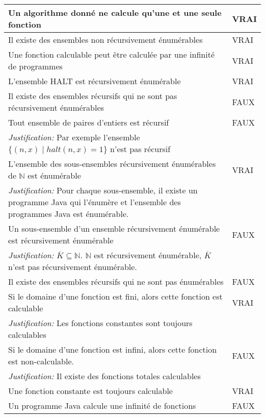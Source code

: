 \begin{tabular}{p{13cm}|l}
    \hline
    Un algorithme donné ne calcule qu'une et une seule fonction & VRAI \\
    \hline
    Il existe des ensembles non récursivement énumérables & VRAI \\
    \hline
    Une fonction calculable peut être calculée par une infinité de programmes & VRAI \\
    \hline
    L'ensemble HALT est récursivement énumérable & VRAI \\
    \hline
    Il existe des ensembles récursifs qui ne sont pas récursivement énumérables & FAUX \\
    \hline
    Tout ensemble de paires d'entiers est récursif & FAUX \\
    \textit{Justification:} Par exemple l'ensemble $\{(n,x) \mid \mathit{halt}(n,x)=1\}$ n'est pas récursif & \\
    \hline
    L'ensemble des sous-ensembles récursivement énumérables de $\mathbb{N}$ est énumérable & VRAI \\
    \textit{Justification:} Pour chaque sous-ensemble, il existe un programme Java qui l'énumère et l'ensemble des programmes Java est énumérable. & \\
    \hline
    Un sous-ensemble d'un ensemble récursivement énumérable est récursivement énumérable & FAUX \\
    \textit{Justification:} $\overline{K} \subseteq \mathbb{N}$. $\mathbb{N}$ est récursivement énumérable, $\overline{K}$ n'est pas récursivement énumérable. & \\
    \hline
    Il existe des ensembles récursifs qui ne sont pas énumérables & FAUX \\
    \hline
    Si le domaine d'une fonction est fini, alors cette fonction est calculable & VRAI \\
    \textit{Justification:} Les fonctions constantes sont toujours calculables & \\
    \hline
    Si le domaine d'une fonction est infini, alors cette fonction est non-calculable. & FAUX \\
    \textit{Justification:} Il existe des fonctions totales calculables & \\
    \hline
    Une fonction constante est toujours calculable & VRAI \\
    \hline
    Un programme Java calcule une infinité de fonctions & FAUX \\

\end{tabular}
